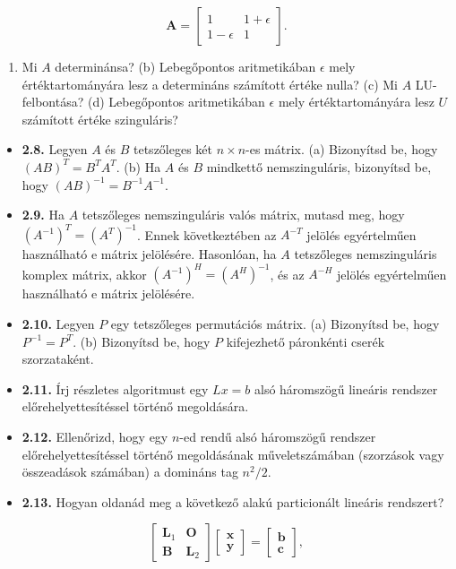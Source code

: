 \documentclass[
  magyar,
  11pt]{article}
\providecommand{\tightlist}{%
  \setlength{\itemsep}{0pt}\setlength{\parskip}{0pt}}
\providecommand{\boldsymbol}[1]{\mathbf{#1}}
\begin{document}
\[\boldsymbol{A} = \begin{bmatrix} 1 & 1+\epsilon \\ 1-\epsilon & 1 \end{bmatrix}.\]

\begin{enumerate}
\def\labelenumi{(\alph{enumi})}
\tightlist
\item
  Mi \(A\) determinánsa? (b) Lebegőpontos aritmetikában \(\epsilon\)
  mely értéktartományára lesz a determináns számított értéke nulla? (c)
  Mi \(A\) LU-felbontása? (d) Lebegőpontos aritmetikában \(\epsilon\)
  mely értéktartományára lesz \(U\) számított értéke szinguláris?
\end{enumerate}

\begin{itemize}
\tightlist
\item
  \textbf{2.8.} Legyen \(A\) és \(B\) tetszőleges két \(n \times n\)-es
  mátrix. (a) Bizonyítsd be, hogy \((AB)^T = B^T A^T\). (b) Ha \(A\) és
  \(B\) mindkettő nemszinguláris, bizonyítsd be, hogy
  \((AB)^{-1} = B^{-1} A^{-1}\).
\item
  \textbf{2.9.} Ha \(A\) tetszőleges nemszinguláris valós mátrix, mutasd
  meg, hogy \((A^{-1})^T = (A^T)^{-1}\). Ennek következtében az
  \(A^{-T}\) jelölés egyértelműen használható e mátrix jelölésére.
  Hasonlóan, ha \(A\) tetszőleges nemszinguláris komplex mátrix, akkor
  \((A^{-1})^H = (A^H)^{-1}\), és az \(A^{-H}\) jelölés egyértelműen
  használható e mátrix jelölésére.
\item
  \textbf{2.10.} Legyen \(P\) egy tetszőleges permutációs mátrix. (a)
  Bizonyítsd be, hogy \(P^{-1} = P^T\). (b) Bizonyítsd be, hogy \(P\)
  kifejezhető páronkénti cserék szorzataként.
\item
  \textbf{2.11.} Írj részletes algoritmust egy \(Lx = b\) alsó
  háromszögű lineáris rendszer előrehelyettesítéssel történő
  megoldására.
\item
  \textbf{2.12.} Ellenőrizd, hogy egy \(n\)-ed rendű alsó háromszögű
  rendszer előrehelyettesítéssel történő megoldásának műveletszámában
  (szorzások vagy összeadások számában) a domináns tag \(n^2/2\).
\item
  \textbf{2.13.} Hogyan oldanád meg a következő alakú particionált
  lineáris rendszert?
\end{itemize}

\[\begin{bmatrix} \boldsymbol{L}_1 & \boldsymbol{O} \\ \boldsymbol{B} & \boldsymbol{L}_2 \end{bmatrix} \begin{bmatrix} \boldsymbol{x} \\ \boldsymbol{y} \end{bmatrix} = \begin{bmatrix} \boldsymbol{b} \\ \boldsymbol{c} \end{bmatrix},\]
\end{document}
